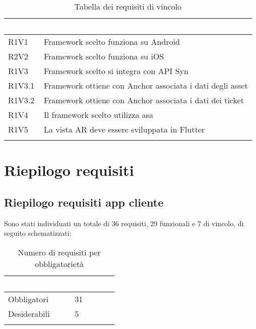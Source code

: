 {
    \setlength{\freewidth}{\dimexpr\textwidth-10\tabcolsep}
    \renewcommand{\arraystretch}{1.5}
    \centering
    \setlength{\aboverulesep}{0pt}
    \setlength{\belowrulesep}{0pt}
    \begin{longtable}{C{.15\freewidth} C{1\freewidth}} 
       \toprule
    \textcolor{white}{\textbf{Codice}}&
    \textcolor{white}{\textbf{Descrizione}}\\
    \toprule
    \endhead

    R1V1 & Framework scelto funziona su Android\\
    R2V2 & Framework scelto funziona su iOS\\
    R1V3 & Framework scelto si integra con API Syn\\
    R1V3.1 & Framework ottiene con Anchor associata i dati degli asset\\
    R1V3.2 & Framework ottiene con Anchor associata i dati dei ticket\\
    R1V4 & Il framework scelto utilizza asa\\
    R1V5 & La vista AR deve essere sviluppata in Flutter\\
    \bottomrule
    \caption{Tabella dei requisiti di vincolo}
    \label{tab:requisiti-di-vincolo}
    \end{longtable}
}



\section{Riepilogo requisiti}
\subsection{Riepilogo requisiti app cliente}
Sono stati individuati un totale di 36 requisiti, 29 funzionali e 7 di vincolo, di seguito schematizzati:

{
    \setlength{\freewidth}{\dimexpr\textwidth-10\tabcolsep}
    \renewcommand{\arraystretch}{1.5}
    \centering
    \setlength{\aboverulesep}{0pt}
    \setlength{\belowrulesep}{0pt}
    \begin{longtable}{C{.25\freewidth} C{.2\freewidth}} 
       \toprule
    \textcolor{white}{\textbf{Obbligatorietà}}&
    \textcolor{white}{\textbf{Quantità}}\\
    \toprule
    \endhead

    Obbligatori & 31\\
    Desiderabili & 5\\
    \bottomrule
    \caption{Numero di requisiti per obbligatorietà}
    \label{tab:requisiti-obbligatorieta}
    \end{longtable}
}

